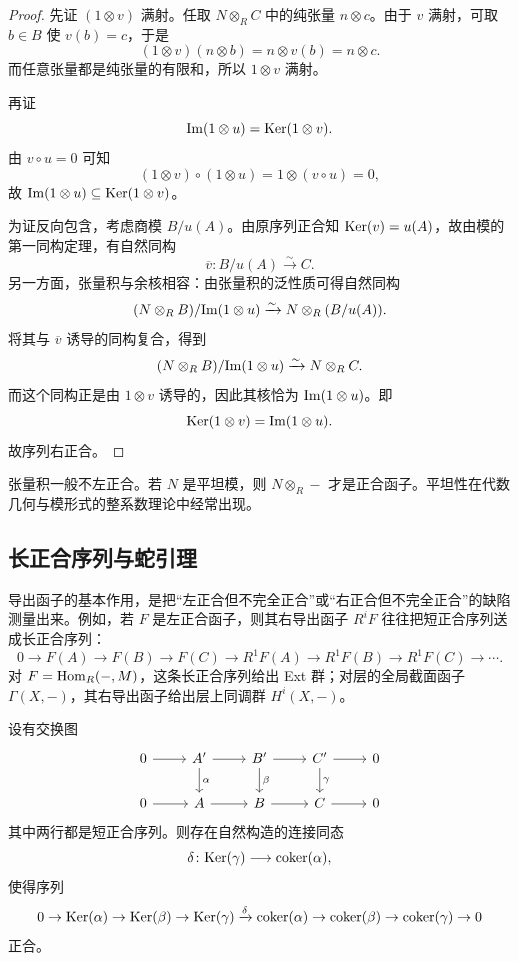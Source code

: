 \begin{proof}
先证 $(1\otimes v)$ 满射。任取 $N\otimes_R C$ 中的纯张量 $n\otimes c$。由于 $v$ 满射，可取 $b\in B$ 使 $v(b)=c$，于是
\[
  (1\otimes v)(n\otimes b)=n\otimes v(b)=n\otimes c.
\]
而任意张量都是纯张量的有限和，所以 $1\otimes v$ 满射。

再证
\[
  \mathrm{Im}(1\otimes u)=\mathrm{Ker}(1\otimes v).
\]
由 $v\circ u=0$ 可知
\[
  (1\otimes v)\circ (1\otimes u)=1\otimes (v\circ u)=0,
\]
故 $\mathrm{Im}(1\otimes u)\subseteq \mathrm{Ker}(1\otimes v)$。

为证反向包含，考虑商模 $B/u(A)$。由原序列正合知 $\mathrm{Ker}(v)=u(A)$，故由模的第一同构定理，有自然同构
\[
  \overline v\colon B/u(A)\xrightarrow{\sim} C.
\]
另一方面，张量积与余核相容：由张量积的泛性质可得自然同构
\[
  (N\otimes_R B)/\mathrm{Im}(1\otimes u)\xrightarrow{\sim} N\otimes_R (B/u(A)).
\]
将其与 $\overline v$ 诱导的同构复合，得到
\[
  (N\otimes_R B)/\mathrm{Im}(1\otimes u)\xrightarrow{\sim} N\otimes_R C.
\]
而这个同构正是由 $1\otimes v$ 诱导的，因此其核恰为 $\mathrm{Im}(1\otimes u)$。即
\[
  \mathrm{Ker}(1\otimes v)=\mathrm{Im}(1\otimes u).
\]
故序列右正合。
\end{proof}

\begin{remark}
张量积一般不左正合。若 $N$ 是平坦模，则 $N\otimes_R -$ 才是正合函子。平坦性在代数几何与模形式的整系数理论中经常出现。
\end{remark}

\subsection{长正合序列与蛇引理}

导出函子的基本作用，是把“左正合但不完全正合”或“右正合但不完全正合”的缺陷测量出来。例如，若 $F$ 是左正合函子，则其右导出函子 $R^iF$ 往往把短正合序列送成长正合序列：
\[
  0\to F(A)\to F(B)\to F(C)\to R^1F(A)\to R^1F(B)\to R^1F(C)\to \cdots.
\]
对 $F=\mathrm{Hom}_R(-,M)$，这条长正合序列给出 Ext 群；对层的全局截面函子 $\Gamma(X,-)$，其右导出函子给出层上同调群 $H^i(X,-)$。

\begin{theorem}[蛇引理]
设有交换图
\[
\begin{tikzcd}
0 \arrow[r] & A' \arrow[r] \arrow[d,"\alpha"] & B' \arrow[r] \arrow[d,"\beta"] & C' \arrow[r] \arrow[d,"\gamma"] & 0 \\
0 \arrow[r] & A \arrow[r] & B \arrow[r] & C \arrow[r] & 0
\end{tikzcd}
\]
其中两行都是短正合序列。则存在自然构造的连接同态
\[
  \delta\colon \mathrm{Ker}(\gamma)\longrightarrow \operatorname{coker}(\alpha),
\]
使得序列
\[
  0\to \mathrm{Ker}(\alpha)\to \mathrm{Ker}(\beta)\to \mathrm{Ker}(\gamma)
  \xrightarrow{\delta}
  \operatorname{coker}(\alpha)\to \operatorname{coker}(\beta)\to \operatorname{coker}(\gamma)\to 0
\]
正合。
\end{theorem}

